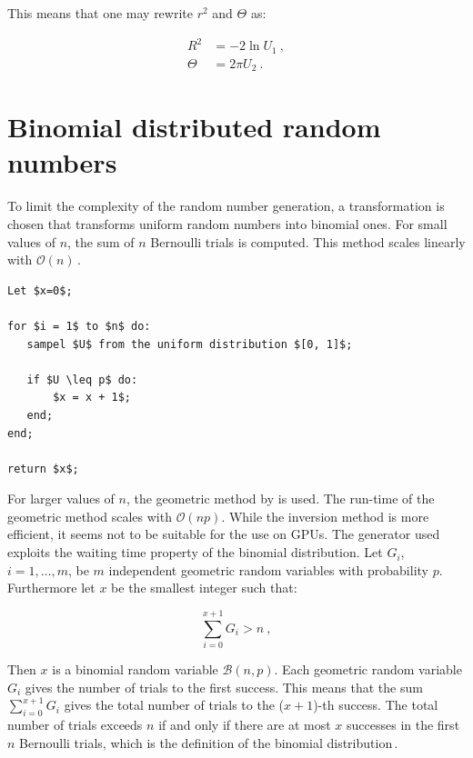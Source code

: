 \documentclass[a4paper]{scrartcl}
\begin{document}
This means that one may rewrite $r^2$ and $\Theta$ as:

\begin{align*}
R^2 & =  -2 \ln U_1~, \\
\Theta & =  2\pi U_2~. 
\end{align*}

\section*{Binomial distributed random numbers}

To limit the complexity of the random number generation, a transformation  is chosen that transforms uniform random numbers into binomial ones. For small values of $n$, the sum of $n$ Bernoulli trials is computed. This method scales linearly with $\mathcal{O}(n)$\,\citep{Knuth1997b, Devroye1986}.

{
\begin{lstlisting}[float, caption={Bernoulli method to sample from a binomial distribution.}, label=alg:binomial_bernoulli_method]
Let $x=0$;

for $i = 1$ to $n$ do:
   sampel $U$ from the uniform distribution $[0, 1]$;
   
   if $U \leq p$ do:
       $x = x + 1$;
   end;
end;

return $x$;
\end{lstlisting}
}

For larger values of $n$, the geometric method by \citet{Devroye1980} is used. The run-time of the geometric method scales with $\mathcal{O}(np)$. While the inversion method is more efficient, it seems not to be suitable for the use on GPUs. The generator used exploits the waiting time property of the binomial distribution. Let $G_i$, $i = 1, \dots, m$, be $m$ independent geometric random variables with probability $p$. Furthermore let $x$ be the smallest integer such that:

\begin{equation*}
\sum_{i = 0}^{x + 1} G_i > n~,
\end{equation*}

Then $x$ is a binomial random variable $\mathcal{B}(n, p)$. Each geometric random variable $G_i$ gives the number of trials to the first success. This means that the sum $\sum_{i = 0}^{x + 1} G_i$ gives the total number of trials to the ($x+1$)-th success. The total number of trials exceeds $n$ if and only if there are at most $x$ successes in the first $n$ Bernoulli trials, which is the definition of the binomial distribution\,\citep{Devroye1986}.
\end{document}
